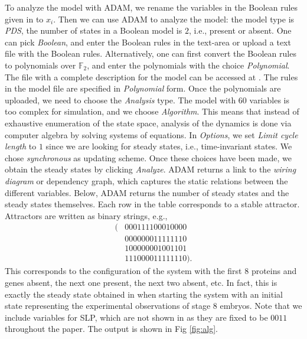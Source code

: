 \documentclass[11pt]{amsart}
\begin{document}
To analyze the model with ADAM, we rename the variables in the Boolean rules given in \cite{AO} to $x_i$. Then we can use ADAM to analyze the model: the model type is {\it PDS}, the number of states in a Boolean model is $2$, i.e., present or absent. One can pick {\it Boolean}, and enter the Boolean rules in the text-area or upload a text file with the Boolean rules. Alternatively, one can first convert the Boolean rules to polynomials over $\mathbb F_2$, and enter the polynomials with the choice {\it Polynomial}.
The file with a complete description for the model can be accessed at \cite{DrosophilaModel}. The rules in the model file are specified in {\it Polynomial} form. Once the polynomials are uploaded, we need to choose the {\it Analysis} type. The model with $60$ variables is too complex for simulation, and we choose {\it Algorithm}. This means that instead of exhaustive enumeration of the state space, analysis of the dynamics is done via computer algebra by solving systems of equations.
In {\it Options}, we set {\it Limit cycle length} to $1$ since we are looking for steady states, i.e., time-invariant states.
We chose {\it synchronous} as updating scheme. Once these choices have been made,
we obtain the steady states by clicking {\it Analyze}.
ADAM returns a link to the {\it wiring diagram} or dependency graph, which captures the static relations between the different variables. Below, ADAM returns the number of steady states and the steady states themselves.
Each row in the table corresponds to a stable attractor. Attractors are written as binary strings, e.g.,
\begin{align*}
(&0 0 0 1 1 1 1 0 0 0 1 0 0 0 0\\
&0 0 0 0 0 0 0 1 1 1 1 1 1 1 0\\
&1 0 0 0 0 0 0 0 1 0 0 1 1 0 1\\
&1 1 1 0 0 0 0 1 1 1 1 1 1 1 0).
\end{align*}
This corresponds to the configuration of the system with the first 8 proteins and genes absent, the next one present, the next two absent, etc. In fact, this is exactly the steady state obtained in \cite[Figure 4(b)]{AO} when starting the system with an initial state representing the experimental observations of stage 8 embryos. Note that we include variables for SLP, which are not shown in \cite[Figure 4(b)]{AO} as they are fixed to be $0011$ throughout the paper. The output is shown in Fig \ref{fig:alg}.
\end{document}
